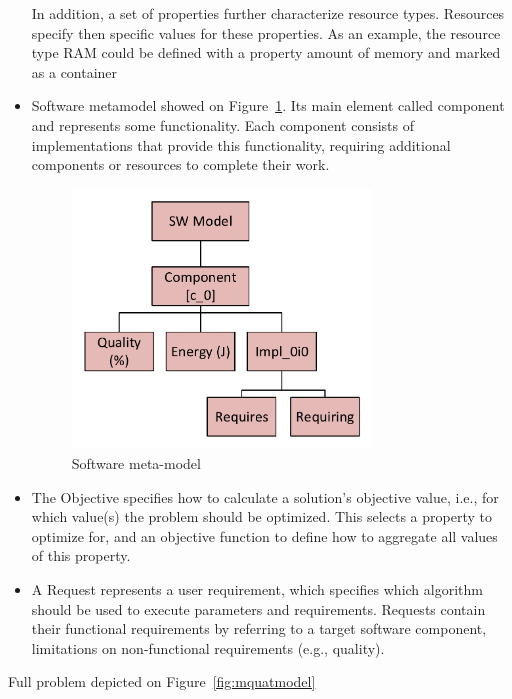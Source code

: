 \begin{itemize}
	In addition, a set of properties further characterize resource types. Resources specify then specific values for these properties. As an example, the resource type RAM could be defined with a property amount of memory and marked as a container
	\item Software metamodel showed on Figure~\ref{fig:SWModel}. Its main element called component and represents some functionality.
	Each component consists of implementations that provide this functionality, requiring additional components or resources to complete their work. 
	\begin{figure}
		\centering
		\includegraphics[width=0.75\textwidth]{images/SWModel}
		\caption[Software meta-model]{Software meta-model}
		\label{fig:SWModel}
	\end{figure}
	\item The Objective specifies how to calculate a solution's objective value, i.e., for which value(s) the problem should be optimized. This selects a property to optimize for, and an objective function to define how to aggregate all values of this property.
	\item A Request represents a user requirement, which specifies which algorithm should be used to execute parameters and requirements. Requests contain their functional requirements by referring to a target software component, limitations on non-functional requirements (e.g., quality).
\end{itemize}
Full problem depicted on Figure~\ref{fig:mquatmodel}
